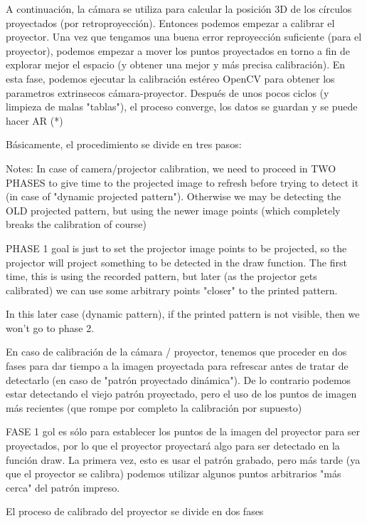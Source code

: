 A continuación, la cámara se utiliza para calcular la posición 3D de los círculos proyectados (por retroproyección). Entonces podemos empezar a calibrar el proyector. Una vez que tengamos una buena error reproyección suficiente (para el proyector), podemos empezar a mover los puntos proyectados en torno a fin de explorar mejor el espacio (y obtener una mejor y más precisa calibración). En esta fase, podemos ejecutar la calibración estéreo OpenCV para obtener los parametros extrinsecos cámara-proyector. Después de unos pocos ciclos (y limpieza de malas "tablas"), el proceso converge, los datos se guardan y se puede hacer AR (*) 

Básicamente, el procedimiento se divide en tres pasos: 

 Notes: In case of camera/projector calibration, we need to proceed in TWO PHASES to give time to the projected image to refresh before trying to detect it (in case of "dynamic projected pattern"). Otherwise we may be detecting the OLD projected pattern, but using the newer image points (which completely breaks the calibration of course)
                
PHASE 1 goal is just to set the projector image points to be projected, so the projector  will project something to be detected in the draw function. The first time, this is using the recorded pattern, but later (as the projector gets calibrated) we can use some arbitrary points "closer" to the printed pattern.

In this later case (dynamic pattern), if the printed pattern is not visible, then we won't go to phase 2. 
                

En caso de calibración de la cámara / proyector, tenemos que proceder en dos fases para dar tiempo a la imagen proyectada para refrescar antes de tratar de detectarlo (en caso de "patrón proyectado dinámica"). De lo contrario podemos estar detectando el viejo patrón proyectado, pero el uso de los puntos de imagen más recientes (que rompe por completo la calibración por supuesto) 

FASE 1 gol es sólo para establecer los puntos de la imagen del proyector para ser proyectados, por lo que el proyector proyectará algo para ser detectado en la función draw. La primera vez, esto es usar el patrón grabado, pero más tarde (ya que el proyector se calibra) podemos utilizar algunos puntos arbitrarios "más cerca" del patrón impreso.



El proceso de calibrado del proyector se divide en dos fases

